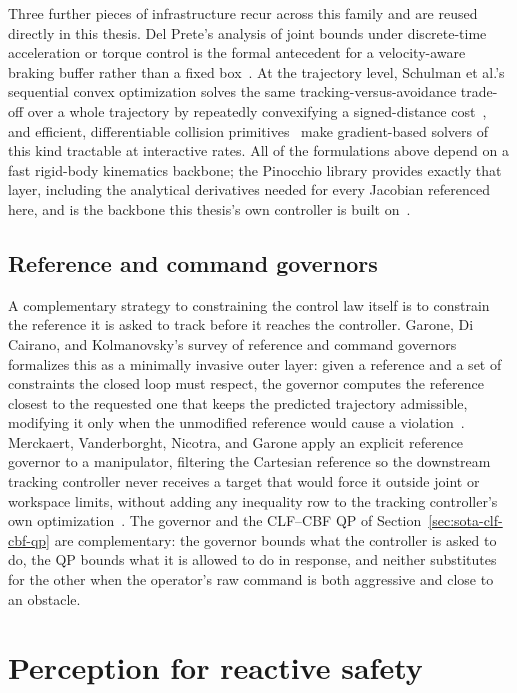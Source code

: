 \documentclass[12pt,a4paper,twoside,openright]{report}
\begin{document}
Three further pieces of infrastructure recur across this family and are reused directly in this thesis. Del Prete's analysis of joint bounds under discrete-time acceleration or torque control is the formal antecedent for a velocity-aware braking buffer rather than a fixed box~\cite{delprete2018joint}. At the trajectory level, Schulman et al.'s sequential convex optimization solves the same tracking-versus-avoidance trade-off over a whole trajectory by repeatedly convexifying a signed-distance cost~\cite{schulman2014trajopt}, and efficient, differentiable collision primitives~\cite{tracy2022diffpills,montaut2023diffcol} make gradient-based solvers of this kind tractable at interactive rates. All of the formulations above depend on a fast rigid-body kinematics backbone; the Pinocchio library provides exactly that layer, including the analytical derivatives needed for every Jacobian referenced here, and is the backbone this thesis's own controller is built on~\cite{carpentier2019}.

\subsection{Reference and command governors}
\label{sec:sota-governors}

A complementary strategy to constraining the control law itself is to constrain the reference it is asked to track before it reaches the controller. Garone, Di Cairano, and Kolmanovsky's survey of reference and command governors formalizes this as a minimally invasive outer layer: given a reference and a set of constraints the closed loop must respect, the governor computes the reference closest to the requested one that keeps the predicted trajectory admissible, modifying it only when the unmodified reference would cause a violation~\cite{garone2017}. Merckaert, Vanderborght, Nicotra, and Garone apply an explicit reference governor to a manipulator, filtering the Cartesian reference so the downstream tracking controller never receives a target that would force it outside joint or workspace limits, without adding any inequality row to the tracking controller's own optimization~\cite{merckaert2018constrained}. The governor and the CLF--CBF QP of Section~\ref{sec:sota-clf-cbf-qp} are complementary: the governor bounds what the controller is asked to do, the QP bounds what it is allowed to do in response, and neither substitutes for the other when the operator's raw command is both aggressive and close to an obstacle.

\section{Perception for reactive safety}
\label{sec:sota-perception}
\end{document}
